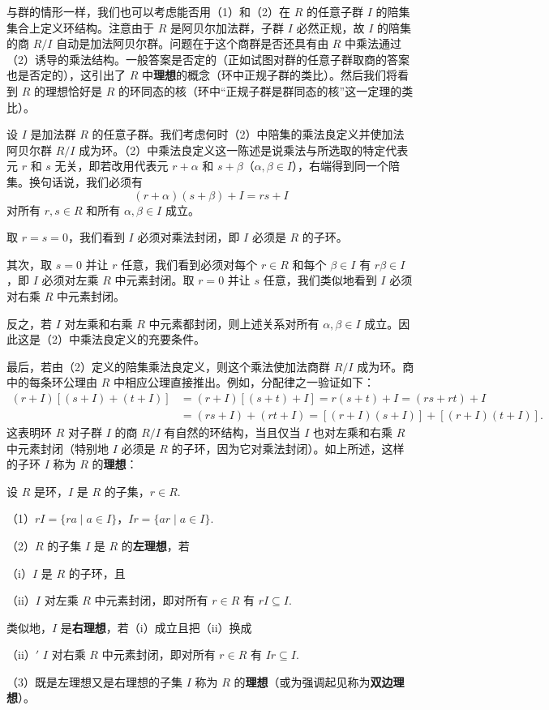 与群的情形一样，我们也可以考虑能否用（1）和（2）在 \(R\) 的任意子群 \(I\) 的陪集集合上定义环结构。注意由于 \(R\) 是阿贝尔加法群，子群 \(I\) 必然正规，故 \(I\) 的陪集的商 \(R/I\) 自动是加法阿贝尔群。问题在于这个商群是否还具有由 \(R\) 中乘法通过（2）诱导的乘法结构。一般答案是否定的（正如试图对群的任意子群取商的答案也是否定的），这引出了 \(R\) 中\textbf{理想}的概念（环中正规子群的类比）。然后我们将看到 \(R\) 的理想恰好是 \(R\) 的环同态的核（环中“正规子群是群同态的核”这一定理的类比）。

设 \(I\) 是加法群 \(R\) 的任意子群。我们考虑何时（2）中陪集的乘法良定义并使加法阿贝尔群 \(R/I\) 成为环。（2）中乘法良定义这一陈述是说乘法与所选取的特定代表元 \(r\) 和 \(s\) 无关，即若改用代表元 \(r+\alpha\) 和 \(s+\beta\)（\(\alpha, \beta \in I\)），右端得到同一个陪集。换句话说，我们必须有
\[
(r+\alpha)(s+\beta) + I = rs + I
\]
对所有 \(r, s \in R\) 和所有 \(\alpha, \beta \in I\) 成立。

取 \(r = s = 0\)，我们看到 \(I\) 必须对乘法封闭，即 \(I\) 必须是 \(R\) 的子环。

其次，取 \(s = 0\) 并让 \(r\) 任意，我们看到必须对每个 \(r \in R\) 和每个 \(\beta \in I\) 有 \(r\beta \in I\)，即 \(I\) 必须对左乘 \(R\) 中元素封闭。取 \(r = 0\) 并让 \(s\) 任意，我们类似地看到 \(I\) 必须对右乘 \(R\) 中元素封闭。

反之，若 \(I\) 对左乘和右乘 \(R\) 中元素都封闭，则上述关系对所有 \(\alpha, \beta \in I\) 成立。因此这是（2）中乘法良定义的充要条件。

最后，若由（2）定义的陪集乘法良定义，则这个乘法使加法商群 \(R/I\) 成为环。商中的每条环公理由 \(R\) 中相应公理直接推出。例如，分配律之一验证如下：
\[
\begin{aligned}
(r+I)\left[(s+I)+(t+I)\right] &= (r+I)\left[(s+t)+I\right] = r(s+t)+I = (rs+rt)+I \\
&= (rs+I) + (rt+I) = [(r+I)(s+I)] + [(r+I)(t+I)].
\end{aligned}
\]
这表明环 \(R\) 对子群 \(I\) 的商 \(R/I\) 有自然的环结构，当且仅当 \(I\) 也对左乘和右乘 \(R\) 中元素封闭（特别地 \(I\) 必须是 \(R\) 的子环，因为它对乘法封闭）。如上所述，这样的子环 \(I\) 称为 \(R\) 的\textbf{理想}：

\begin{definition}
设 \(R\) 是环，\(I\) 是 \(R\) 的子集，\(r \in R\).

（1）\(rI = \{ra \mid a \in I\}\)，\(Ir = \{ar \mid a \in I\}\).

（2）\(R\) 的子集 \(I\) 是 \(R\) 的\textbf{左理想}，若

（i）\(I\) 是 \(R\) 的子环，且

（ii）\(I\) 对左乘 \(R\) 中元素封闭，即对所有 \(r \in R\) 有 \(rI \subseteq I\).

类似地，\(I\) 是\textbf{右理想}，若（i）成立且把（ii）换成

（ii）\('\) \(I\) 对右乘 \(R\) 中元素封闭，即对所有 \(r \in R\) 有 \(Ir \subseteq I\).

（3）既是左理想又是右理想的子集 \(I\) 称为 \(R\) 的\textbf{理想}（或为强调起见称为\textbf{双边理想}）。
\end{definition}

